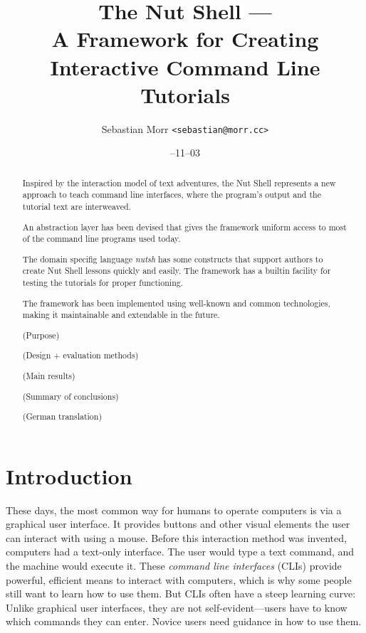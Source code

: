 \documentclass[paper=a4,twoside,abstract=on,cleardoublepage=empty,numbers=noenddot,toc=bib,12pt,appendixprefix=true]{scrreprt}
\title{The Nut Shell ---\\A Framework for Creating\\Interactive Command Line Tutorials}
\author{\sffamily Sebastian Morr \texttt{<sebastian@morr.cc>}}
\date{\sffamily 2013--11--03}
\begin{document}
\maketitle
\restoregeometry


\begin{abstract}
    Inspired by the interaction model of text adventures, the Nut Shell represents a new approach to teach command line interfaces, where the program's output and the tutorial text are interweaved.

    An abstraction layer has been devised that gives the framework uniform access to most of the command line programs used today.

    The domain specifig language \emph{nutsh} has some constructs that support authors to create Nut Shell lessons quickly and easily. The framework has a builtin facility for testing the tutorials for proper functioning.

    The framework has been implemented using well-known and common technologies, making it maintainable and extendable in the future.

    (Purpose)

    (Design + evaluation methods)

    (Main results)

    (Summary of conclusions)
\end{abstract}

%
\begin{abstract}
    (German translation)
\end{abstract}
%

\setcounter{tocdepth}{2}
\tableofcontents
\listoffigures
\listoftables

\chapter{Introduction}

These days, the most common way for humans to operate computers is via a graphical user interface. It provides buttons and other visual elements the user can interact with using a mouse. Before this interaction method was invented, computers had a text-only interface. The user would type a text command, and the machine would execute it. These \emph{command line interfaces} (CLIs) provide powerful, efficient means to interact with computers, which is why some people still want to learn how to use them. But CLIs often have a steep learning curve: Unlike graphical user interfaces, they are not self-evident---users have to know which commands they can enter. Novice users need guidance in how to use them.
\end{document}

